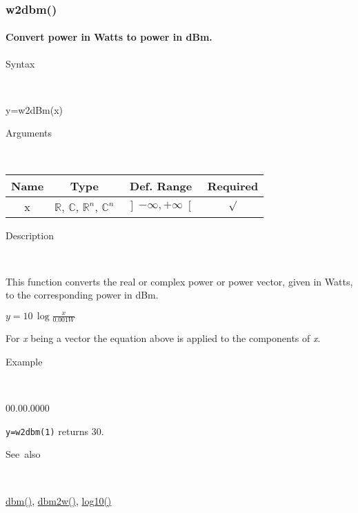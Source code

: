 \newpage
\subsubsection*{\hypertarget{w2dbm}{}{\Large w2dbm()}}


\paragraph{\label{par:w2dbm}Convert power in Watts to power in dBm.}

\begin{description}
\item [Syntax]~
\end{description}
y=w2dBm(x)

\begin{description}
\item [Arguments]~
\end{description}
\begin{tabular}{|c|c|c|c|}
\hline 
Name&
Type&
Def. Range&
Required\tabularnewline
\hline
\hline 
x&
$\mathbb{R}$, $\mathbb{C}$, $\mathbb{R}^{n}$, $\mathbb{C}^{n}$&
$\left]-\infty,+\infty\right[$&
$\surd$\tabularnewline
\hline
\end{tabular}

\begin{description}
\item [Description]~
\end{description}
This function converts the real or complex power or power vector,
given in Watts, to the corresponding power in dBm.

\medskip{}
$y=10\,\log{\displaystyle \frac{x}{0.001W}}$
\medskip{}

\noindent For \textit{x} being a vector the equation above is applied
to the components of \textit{x}.

\begin{description}
\item [Example]~
\end{description}
\begin{lyxlist}{00.00.0000}
\item [\texttt{y=w2dbm(1)}]returns 30.
\end{lyxlist}
\begin{description}
\item [See~also]~
\end{description}
\textcolor{blue}{\hyperlink{dbm}{dbm()}}\textcolor{black}{,} \textcolor{blue}{\hyperlink{dbm2w}{dbm2w()}}\textcolor{black}{,}
\textcolor{blue}{\hyperlink{log10}{log10()}}


